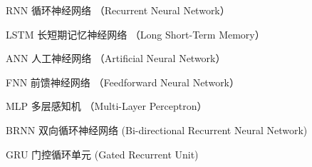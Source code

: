 ﻿\begin{denotation}



\item[RNN] 循环神经网络 （Recurrent Neural Network）
\item[LSTM] 长短期记忆神经网络 （Long Short-Term Memory）
\item[ANN] 人工神经网络 （Artificial Neural Network）
\item[FNN] 前馈神经网络 （Feedforward Neural Network）
\item[MLP] 多层感知机 （Multi-Layer Perceptron）
\item[BRNN] 双向循环神经网络 (Bi-directional Recurrent Neural Network)
\item[GRU] 门控循环单元 (Gated Recurrent Unit)

\end{denotation}
